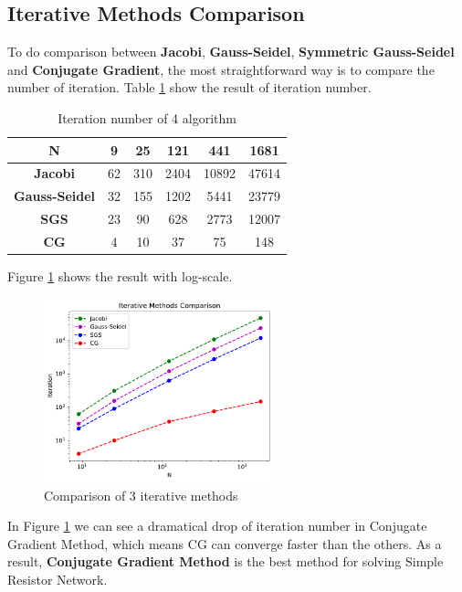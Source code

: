 \documentclass{article}
\begin{document}
\subsection{Iterative Methods Comparison}
\label{sec:iter comparison}
To do comparison between \textbf{Jacobi}, \textbf{Gauss-Seidel}, \textbf{Symmetric Gauss-Seidel} and \textbf{Conjugate Gradient}, the most
straightforward way is to compare the number of iteration. Table \ref{tab:3 iter} show the result of iteration number.
\begin{table}[H]
	\begin{center}
		\begin{tabular}{|c|c|c|c|c|c|}
			\hline
			\textbf{N} & 9 & 25 & 121 & 441 & 1681 \\ \hline
			\textbf{Jacobi} & 62 & 310 & 2404 & 10892 & 47614 \\ \hline
			\textbf{Gauss-Seidel} & 32 & 155 & 1202 & 5441 & 23779 \\ \hline
			\textbf{SGS} & 23 & 90 & 628 & 2773 & 12007 \\ \hline
			\textbf{CG} & 4 & 10 & 37 & 75 & 148 \\ \hline
		\end{tabular}
	\end{center}
\caption{Iteration number of 4 algorithm}
\label{tab:3 iter}
\end{table}
Figure \ref{fig:iter comparison} shows the result with log-scale.
\begin{figure}[H]
	\centering
	\includegraphics[width=0.6\textwidth]{src/iter.pdf}
	\caption{Comparison of 3 iterative methods}
	\label{fig:iter comparison}
\end{figure}
In Figure \ref{fig:iter comparison} we can see a dramatical drop of iteration number in Conjugate Gradient Method, which means CG can converge 
faster than the others. As a result, \textbf{Conjugate Gradient Method} is the best method for solving Simple Resistor Network.
\end{document}
